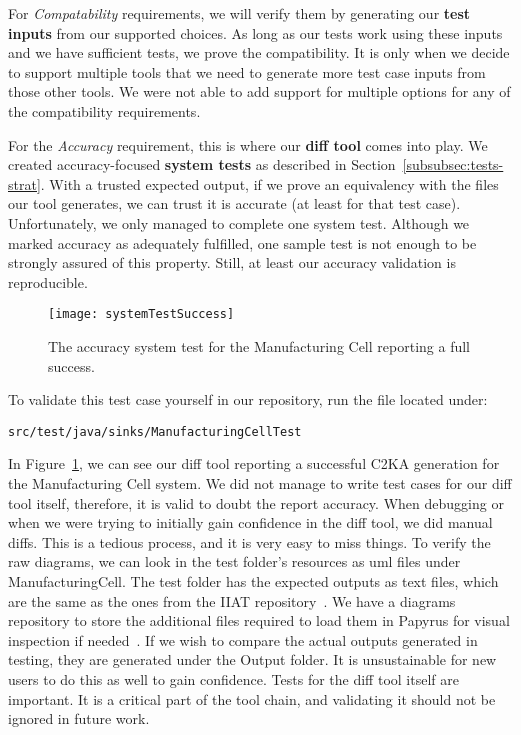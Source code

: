 For \textit{Compatability} requirements,
we will verify them by generating our \textbf{test inputs} from our supported choices.
As long as our tests work using these inputs and we have sufficient tests, we prove the compatibility.
It is only when we decide to support multiple tools that we need to generate more test case inputs from those other tools.
We were not able to add support for multiple options for any of the compatibility requirements.

For the \textit{Accuracy} requirement, this is where our \textbf{diff tool} comes into play.
We created accuracy-focused \textbf{system tests} as described in Section~\ref{subsubsec:tests-strat}.
With a trusted expected output, if we prove an equivalency with the files our tool generates, we can trust it is accurate (at least for that test case).
Unfortunately, we only managed to complete one system test.
Although we marked accuracy as adequately fulfilled, one sample test is not enough to be strongly assured of this property.
Still, at least our accuracy validation is reproducible.

\begin{figure}
    \centering
    \texttt{[image: systemTestSuccess]}
    \caption{The accuracy system test for the Manufacturing Cell reporting a full success.}
    \label{fig:acc-test}
\end{figure}
To validate this test case yourself in our repository, run the file located under:
\begin{verbatim}src/test/java/sinks/ManufacturingCellTest\end{verbatim}
In Figure~\ref{fig:acc-test}, we can see our diff tool reporting a successful C2KA generation for the Manufacturing Cell system.
We did not manage to write test cases for our diff tool itself, therefore, it is valid to doubt the report accuracy.
When debugging or when we were trying to initially gain confidence in the diff tool, we did manual diffs.
This is a tedious process, and it is very easy to miss things.
To verify the raw diagrams, we can look in the test folder's resources as uml files under ManufacturingCell.
The test folder has the expected outputs as text files, which are the same as the ones from the IIAT repository~\cite{repo_iiat}.
We have a diagrams repository to store the additional files required to load them in Papyrus for visual inspection if needed~\cite{repo_diagram}.
If we wish to compare the actual outputs generated in testing, they are generated under the Output folder.
It is unsustainable for new users to do this as well to gain confidence.
Tests for the diff tool itself are important.
It is a critical part of the tool chain, and validating it should not be ignored in future work.

